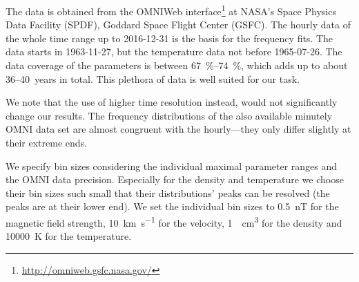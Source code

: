 The data is obtained from the OMNIWeb interface\footnote{\url{http://omniweb.gsfc.nasa.gov/}} at NASA's Space Physics Data Facility (SPDF), Goddard Space Flight Center (GSFC).
%
The hourly data of the whole time range up to \mbox{2016-12-31} is the basis for the frequency fits. The data starts in \mbox{1963-11-27}, but the temperature data not before \mbox{1965-07-26}. The data coverage of the parameters is between \SIrange{67}{74}{\percent}, which adds up to about 36--40~years in total. This plethora of data is well suited for our task.

We note that the use of higher time resolution instead, would not significantly change our results. The frequency distributions of the also available minutely OMNI data set are almost congruent with the hourly---they only differ slightly at their extreme ends.

We specify bin sizes considering the individual maximal parameter ranges and the OMNI data precision. Especially for the density and temperature we choose their bin sizes such small that their distributions' peaks can be resolved (the peaks are at their lower end). We set the individual bin sizes to \SI{0.5}{nT} for the magnetic field strength, \SI{10}{\km\per\s} for the velocity, \SI{1}{\per\cm\cubed} for the density and \SI{10000}{\K} for the temperature.

